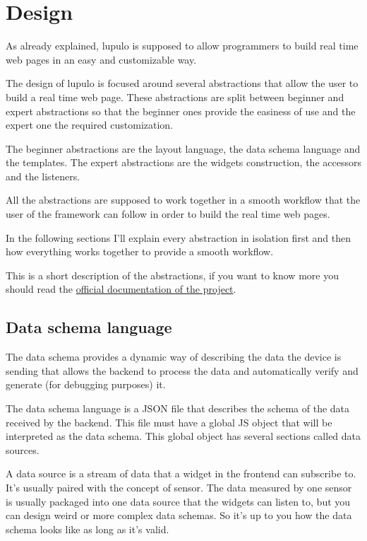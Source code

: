 \documentclass[12pt]{article}
\begin{document}
    \section{Design}
        As already explained, lupulo is supposed to allow programmers to build
        real time web pages in an easy and customizable way.

        The design of lupulo is focused around several abstractions that allow
        the user to build a real time web page. These abstractions are split
        between beginner and expert abstractions so that the beginner ones
        provide the easiness of use and the expert one the required
        customization.
        
        The beginner abstractions are the layout language, the data schema
        language and the templates. The expert abstractions are the widgets
        construction, the accessors and the listeners.

        All the abstractions are supposed to work together in a smooth workflow
        that the user of the framework can follow in order to build the real
        time web pages.

        In the following sections I'll explain every abstraction in isolation
        first and then how everything works together to provide a smooth
        workflow.

        This is a short description of the abstractions, if you want to know
        more you should read the
        \href{http://lupulo.readthedocs.org/en/latest/index.html}{official
        documentation of the project}.

        \subsection{Data schema language}
            The data schema provides a dynamic way of describing the data the
            device is sending that allows the backend to process the data and
            automatically verify and generate (for debugging purposes) it.

            The data schema language is a JSON file that describes the schema of
            the data received by the backend.  This file must have a global JS
            object that will be interpreted as the data schema. This global
            object has several sections called data sources.

            A data source is a stream of data that a widget in the frontend can
            subscribe to.  It's usually paired with the concept of sensor.
            The data measured by one sensor is usually packaged into one data
            source that the widgets can listen to, but you can design weird or
            more complex data schemas. So it's up to you how the data schema
            looks like as long as it's valid.
\end{document}
